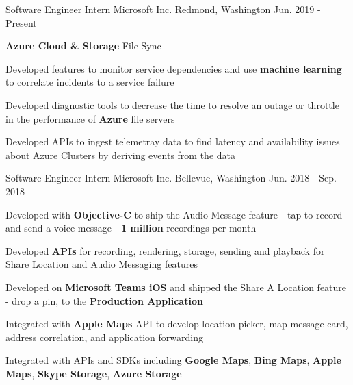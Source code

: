 


\begin{cventries}

\begin{comment}
\cventry
{Software Engineer Intern}
{Microsoft}
{Redmond, Washington}
{Jun. 2018 - Sep. 2018}
{
\begin{cvitems}
\item {Will develop on the frameworks team}
\end{cvitems}
}
\end{comment}

\cventry
	{Software Engineer Intern}
	{Microsoft Inc.}
	{Redmond, Washington}
	{Jun. 2019 - Present}
{								
	\begin{cvitems} 
        \item {\textbf{Azure Cloud \& Storage} File Sync}
                \item {Developed features to monitor service dependencies and use \textbf{machine learning} to correlate incidents to a service failure}
                \item {Developed diagnostic tools to decrease the time to resolve an outage or throttle in the performance of \textbf{Azure} file servers}
                \item {Developed APIs to ingest telemetray data to find latency and availability issues about Azure Clusters by deriving events from the data}
	\end{cvitems}
}

\cventry
	{Software Engineer Intern}
	{Microsoft Inc.}
	{Bellevue, Washington}
	{Jun. 2018 - Sep. 2018}
{								
	\begin{cvitems}
        \item {Developed with \textbf{Objective-C} to ship the Audio Message feature - tap to record and send a voice message - \textbf{1 million} recordings per month}
        \item {Developed \textbf{APIs} for recording, rendering, storage, sending and playback for Share Location and Audio Messaging features}
        \item {Developed on \textbf{Microsoft Teams iOS} and shipped the Share A Location feature - drop a pin, to the \textbf{Production Application}}
        \item {Integrated with \textbf{Apple Maps} API to develop location picker, map message card, address correlation, and application forwarding}
        \item {Integrated with APIs and SDKs including \textbf{Google Maps}, \textbf{Bing Maps}, \textbf{Apple Maps}, \textbf{Skype Storage}, \textbf{Azure Storage}}
	\end{cvitems}
}


\end{cventries}
